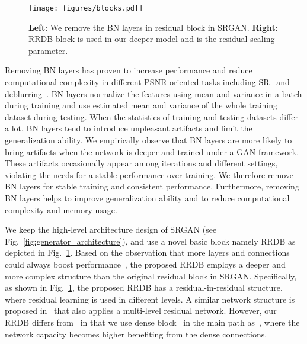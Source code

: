 \documentclass[runningheads]{llncs}
\begin{document}
\begin{figure}[htbp]
	\vspace{-0.2cm}
	\begin{center}
		\texttt{[image: figures/blocks.pdf]}
	\end{center}
	\vspace{-0.3cm}
	\caption{\textbf{Left}: We remove the BN layers in residual block in SRGAN. \textbf{Right}: RRDB block is used in 
		our	deeper model and  is the residual scaling parameter.}
	\label{fig:blocks}
	\vspace{-0.3cm}
\end{figure}

Removing BN layers has proven to increase performance and reduce computational complexity in different PSNR-oriented  
tasks including SR~\cite{lim2017enhanced} and deblurring~\cite{nah2017deep}.
BN layers normalize the features using mean and variance in a batch during training and use estimated mean and 
variance of the whole training dataset during testing.
When the statistics of training and testing datasets differ a lot, BN layers tend to introduce unpleasant artifacts and 
limit the generalization ability. 
We empirically observe that BN layers are more likely to bring artifacts when the network is deeper and trained under 
a GAN framework.
These artifacts occasionally appear among iterations and different settings, violating the needs for a stable 
performance over training.
We therefore remove BN layers for stable training and consistent performance.  
Furthermore, removing BN layers helps to improve generalization ability and to reduce computational complexity and 
memory usage.





We keep the high-level architecture design of SRGAN (see Fig.~\ref{fig:generator_architecture}), and use a  
novel basic block namely RRDB as depicted in Fig.~\ref{fig:blocks}.
Based on the observation that more layers and connections could always boost 
performance~\cite{lim2017enhanced,zhang2018residual,zhang2018image}, the proposed RRDB employs a deeper and more 
complex 
structure than the original residual block in SRGAN.
Specifically, as shown in Fig.~\ref{fig:blocks}, the proposed RRDB has a residual-in-residual structure, where residual 
learning is used in different levels.
A similar network structure is proposed in~\cite{zhang2017residual} that also applies a multi-level residual network.
However, our RRDB differs from~\cite{zhang2017residual} in that we use dense block~\cite{huang2016densely}  
in the main path as~\cite{zhang2018residual}, where the network capacity becomes higher benefiting from the dense 
connections.
\end{document}
